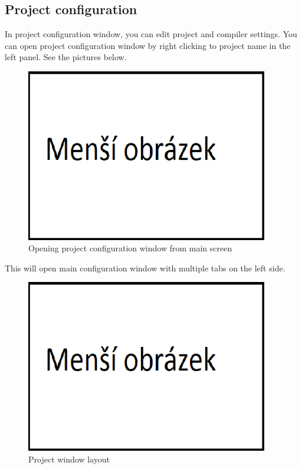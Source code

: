                 \subsection{Project configuration}
                In project configuration window, you can edit project and compiler settings.
                You can open project configuration window by right clicking to project name in the left panel. See the pictures below.
                    \begin{figure}
                        \centering{}
                        \includegraphics [width=300pt]{img/mensi_obrazek.png}
                        \caption{Opening project configuration window from main screen}
                    \end{figure}
                This will open main configuration window with multiple tabs on the left side.
                        \begin{figure}
                            \centering{}
                            \includegraphics [width=300pt]{img/mensi_obrazek.png}
                            \caption{Project window layout}
                        \end{figure}

